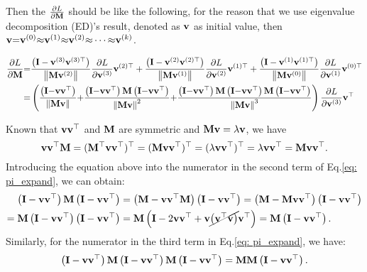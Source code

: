 	Then the $\frac{\partial L}{\partial \mathbf{M}}$ should be like the following, for the reason that we use eigenvalue decomposition (ED)'s result, denoted as $\mathbf{v}$ as initial value, then $\mathbf{v} {=} \mathbf{v}^{(0)} {\approx}\mathbf{v}^{(1)} {\approx} \mathbf{v}^{(2)}{\approx} \cdots {\approx}\mathbf{v}^{(k)}$. 
	
	\begin{equation}
	\begin{aligned} 
	\frac{\partial L}{\partial \mathbf{M}}
	&{=}\frac{\left(\mathbf{I}-\mathbf{v}^{(3)} \mathbf{v}^{(3)\top}\right)}{\left\|\mathbf{M} \mathbf{v}^{(2)}\right\|} \frac{\partial L}{\partial \mathbf{v}^{(3)}} \mathbf{v}^{(2)\top} +
	\frac{\left(\mathbf{I}-\mathbf{v}^{(2)} \mathbf{v}^{(2)\top}\right)}{\left\|\mathbf{M} \mathbf{v}^{(1)}\right\|} \frac{\partial L}{\partial \mathbf{v}^{(2)}} \mathbf{v}^{(1)\top} + 
	\frac{\left(\mathbf{I}-\mathbf{v}^{(1)} \mathbf{v}^{(1)\top}\right)}{\left\|\mathbf{M} \mathbf{v}^{(0)}\right\|} \frac{\partial L}{\partial \mathbf{v}^{(1)}} \mathbf{v}^{(0)\top}\\
	&{=} \left( \frac{\left(\mathbf{I} {-} \mathbf{v} \mathbf{v}^{\top}\right)}{\left\|\mathbf{M} \mathbf{v}\right\|} {+}
	 \frac{\left(\mathbf{I} {-} \mathbf{v} \mathbf{v}^{\top}\right) \mathbf{M}  \left(\mathbf{I} {-} \mathbf{v} \mathbf{v}^{\top}\right)}{\left\|\mathbf{M} \mathbf{v}\right\|^{2}}  {+} 
	 \frac{\left(\mathbf{I} {-} \mathbf{v} \mathbf{v}^{\top}\right) \mathbf{M} \left(\mathbf{I} {-} \mathbf{v} \mathbf{v}^{\top}\right) \mathbf{M} \left(\mathbf{I} {-} \mathbf{v} \mathbf{v}^{\top}\right)}{\left\|\mathbf{M} \mathbf{v}\right\|^{3}} \right)
	 \frac{\partial L}{\partial \mathbf{v}^{(3)}} \mathbf{v}^{\top}
	\end{aligned}
	\label{eq: pi_expand}
	\end{equation}
	
	Known that $\mathbf{v} \mathbf{v}^{\top}$ and $\mathbf{M}$ are symmetric and $\mathbf{M} \mathbf{v} = \lambda \mathbf{v}$, we have 
$$\mathbf{v}\mathbf{v}^{\top}\mathbf{M} = (\mathbf{M}^{\top}\mathbf{v}\mathbf{v}^{\top})^{\top} = (\mathbf{M}\mathbf{v}\mathbf{v}^{\top})^{\top} = (\lambda\mathbf{v}\mathbf{v}^{\top})^{\top} = \lambda\mathbf{v}\mathbf{v}^{\top} = \mathbf{M}\mathbf{v}\mathbf{v}^{\top}.$$
	Introducing the equation above into the numerator in the second term of Eq.\ref{eq: pi_expand}, we can obtain:
	\begin{equation}
	\begin{aligned}
	\left(\mathbf{I} - \mathbf{v} \mathbf{v}^{\top}\right) \mathbf{M}  \left(\mathbf{I} - \mathbf{v} \mathbf{v}^{\top}\right) &
	= \left(\mathbf{M} - \mathbf{v} \mathbf{v}^{\top}\mathbf{M}\right) \left(\mathbf{I} - \mathbf{v} \mathbf{v}^{\top}\right) 
	=  \left(\mathbf{M} - \mathbf{M} \mathbf{v} \mathbf{v}^{\top}\right) \left(\mathbf{I} - \mathbf{v} \mathbf{v}^{\top}\right) \\
	= \mathbf{M} \left(\mathbf{I} - \mathbf{v} \mathbf{v}^{\top}\right) \left(\mathbf{I} - \mathbf{v} \mathbf{v}^{\top}\right) &
	= \mathbf{M} \left(\mathbf{I} - 2\mathbf{v} \mathbf{v}^{\top} + \mathbf{v} \cancel{\left(\mathbf{v}^{\top}\mathbf{v} \right)} \mathbf{v}^{\top}\right) 
	= \mathbf{M} \left(\mathbf{I} - \mathbf{v} \mathbf{v}^{\top} \right).
	\end{aligned}
	\label{eq: term1}
	\end{equation}
	Similarly, for the numerator in the third term in Eq.\ref{eq: pi_expand}, we have:
	\begin{equation}
	\left(\mathbf{I} - \mathbf{v} \mathbf{v}^{\top}\right) \mathbf{M} \left(\mathbf{I} - \mathbf{v} \mathbf{v}^{\top}\right) \mathbf{M} \left(\mathbf{I} - \mathbf{v} \mathbf{v}^{\top}\right) = \mathbf{M} \mathbf{M} \left(\mathbf{I} - \mathbf{v} \mathbf{v}^{\top} \right).
	\label{eq: term2}
	\end{equation}
	
